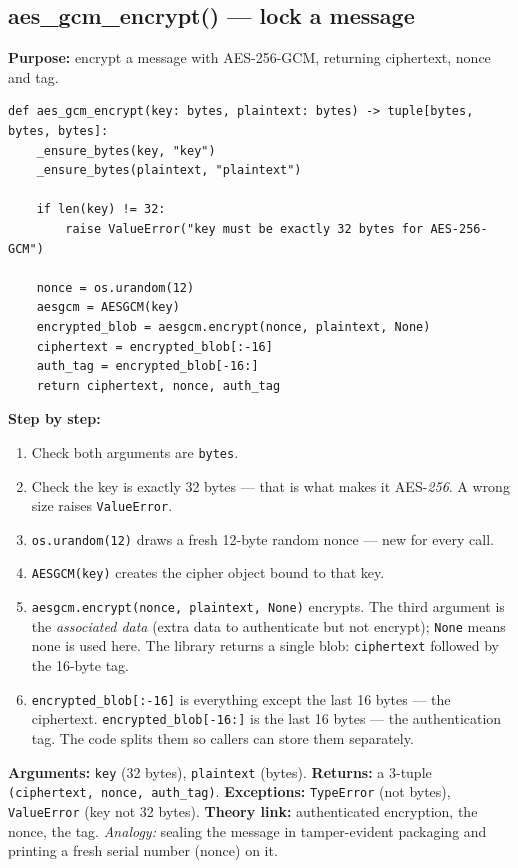 \documentclass[11pt,a4paper]{report}
\begin{document}
\subsection{aes\_gcm\_encrypt() --- lock a message}
\textbf{Purpose:} encrypt a message with AES-256-GCM, returning ciphertext, nonce
and tag.
\begin{lstlisting}[style=py,caption={crypto.py --- AES-256-GCM encryption.}]
def aes_gcm_encrypt(key: bytes, plaintext: bytes) -> tuple[bytes, bytes, bytes]:
    _ensure_bytes(key, "key")
    _ensure_bytes(plaintext, "plaintext")

    if len(key) != 32:
        raise ValueError("key must be exactly 32 bytes for AES-256-GCM")

    nonce = os.urandom(12)
    aesgcm = AESGCM(key)
    encrypted_blob = aesgcm.encrypt(nonce, plaintext, None)
    ciphertext = encrypted_blob[:-16]
    auth_tag = encrypted_blob[-16:]
    return ciphertext, nonce, auth_tag
\end{lstlisting}
\textbf{Step by step:}
\begin{enumerate}
  \item Check both arguments are \texttt{bytes}.
  \item Check the key is exactly 32 bytes --- that is what makes it AES-\emph{256}.
        A wrong size raises \texttt{ValueError}.
  \item \texttt{os.urandom(12)} draws a fresh 12-byte random nonce --- new for
        every call.
  \item \texttt{AESGCM(key)} creates the cipher object bound to that key.
  \item \texttt{aesgcm.encrypt(nonce, plaintext, None)} encrypts. The third
        argument is the \emph{associated data} (extra data to authenticate but
        not encrypt); \texttt{None} means none is used here. The library returns
        a single blob: \texttt{ciphertext} followed by the 16-byte tag.
  \item \texttt{encrypted\_blob[:-16]} is everything except the last 16 bytes ---
        the ciphertext. \texttt{encrypted\_blob[-16:]} is the last 16 bytes ---
        the authentication tag. The code splits them so callers can store them
        separately.
\end{enumerate}
\textbf{Arguments:} \texttt{key} (32 bytes), \texttt{plaintext} (bytes).
\textbf{Returns:} a 3-tuple \texttt{(ciphertext, nonce, auth\_tag)}.
\textbf{Exceptions:} \texttt{TypeError} (not bytes), \texttt{ValueError} (key not
32 bytes). \textbf{Theory link:} authenticated encryption, the nonce, the tag.
\emph{Analogy:} sealing the message in tamper-evident packaging and printing a
fresh serial number (nonce) on it.
\end{document}

